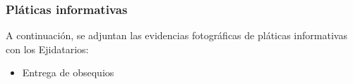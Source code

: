 \subsubsection{Pláticas informativas}

A continuación, se adjuntan las evidencias fotográficas de pláticas informativas con los Ejidatarios:





\begin{itemize}
  \item Entrega de obsequios
\end{itemize}

